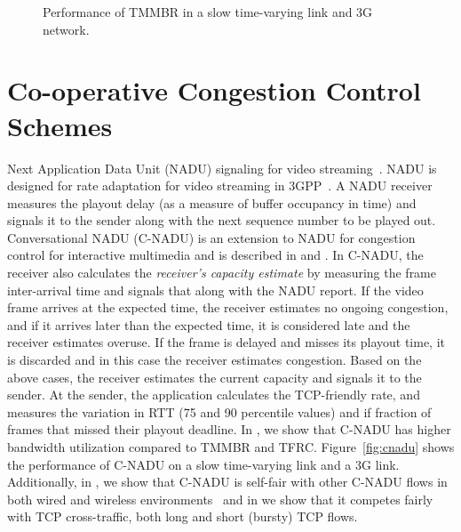 \begin{figure}
  \centerline{
  }
  \caption{Performance of TMMBR in a slow time-varying link and 3G network.}
  \label{fig:tmmbr}
\end{figure}

\section{Co-operative Congestion Control Schemes}
\label{cc:co-op}

Next Application Data Unit (NADU) signaling for video
streaming~\cite{nadu.1070341,nadu.1530486}. NADU is designed for rate
adaptation for video streaming in 3GPP~\cite{3gpp.26.234}. A NADU receiver
measures the playout delay (as a measure of buffer occupancy in time) and
signals it to the sender along with the next sequence number to be played out.
Conversational NADU (C-NADU) is an extension to NADU for congestion control
for interactive multimedia and is described in  and
. In C-NADU, the receiver also calculates the
\emph{receiver's capacity estimate} by measuring the frame inter-arrival time
and signals that along with the NADU report. If the video frame arrives at the
expected time, the receiver estimates no ongoing congestion, and if it arrives
later than the expected time, it is considered late and the receiver estimates
overuse. If the frame is delayed and misses its playout time, it is discarded
and in this case the receiver estimates congestion. Based on the above cases,
the receiver estimates the current capacity and signals it to the sender. At
the sender, the application calculates the TCP-friendly rate, and measures the
variation in RTT (75 and 90 percentile values) and if fraction of frames that
missed their playout deadline. In , we show that C-NADU has
higher bandwidth utilization compared to TMMBR and TFRC.
Figure~\ref{fig:cnadu} shows the performance of C-NADU on a slow time-varying
link and a 3G link. Additionally, in , we show that C-NADU is
self-fair with other C-NADU flows in both wired and wireless
environments~\cite{singh:2010.thesis} and in  we show that it
competes fairly with TCP cross-traffic, both long and short (bursty) TCP
flows.

